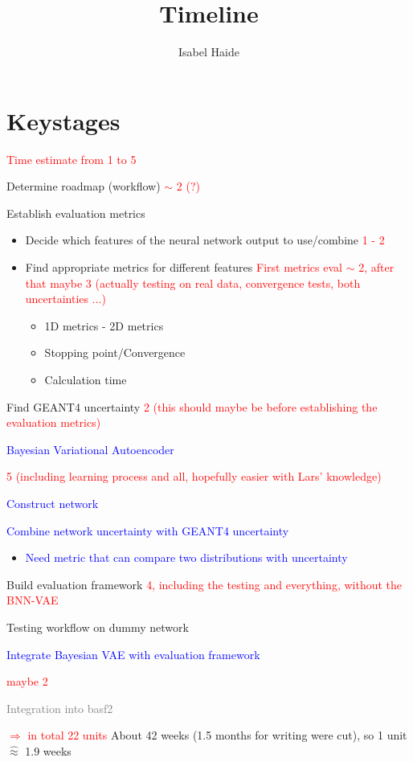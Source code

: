 \documentclass[10pt,a4paper]{article}
\author{Isabel Haide}
\title{Timeline}
\begin{document}
\section*{Keystages}
\textcolor{red}{Time estimate from 1 to 5}
\begin{itemize}
\item[(1) ] Determine roadmap (workflow) \textcolor{red}{$\sim$ 2 (?)}
\item[(2) ] Establish evaluation metrics 
\begin{itemize}
\item[(2a)] Decide which features of the neural network output to use/combine \textcolor{red}{1 - 2 }
\item[(2b)] Find appropriate metrics for different features \textcolor{red}{First metrics eval $\sim$ 2, after that maybe 3 (actually testing on real data, convergence tests, both uncertainties ...)}

\begin{itemize}
\item 1D metrics - 2D metrics
\item Stopping point/Convergence
\item Calculation time
\end{itemize}

\end{itemize}
\item[(3) ] Find GEANT4 uncertainty \textcolor{red}{2 (this should maybe be before establishing the evaluation metrics)}
\textcolor{blue}{\item[(3*)] Bayesian Variational Autoencoder} \textcolor{red}{5 (including learning process and all, hopefully easier with Lars' knowledge)}
\begin{itemize}
\item[\textcolor{blue}{(3*a)}] \textcolor{blue}{Construct network}
\textcolor{blue}{\item[(3*b)] Combine network uncertainty with GEANT4 uncertainty}
\begin{itemize}
\item[\textcolor{blue}{*}] \textcolor{blue}{Need metric that can compare two distributions with uncertainty}
\end{itemize}
\end{itemize}
\item[(4) ] Build evaluation framework \textcolor{red}{4, including the testing and everything, without the BNN-VAE}
\begin{itemize}
\item[(4a)] Testing workflow on dummy network
\textcolor{blue}{\item[(4b)] Integrate Bayesian VAE with evaluation framework} \textcolor{red}{maybe 2}
\end{itemize}
\textcolor{gray}{\item[(5) ] Integration into basf2}
\end{itemize}
\textcolor{red}{$\Rightarrow$ in total 22 units} \newline
About 42 weeks (1.5 months for writing were cut), so 1 unit $\widehat{\approx}$ 1.9 weeks \newline
\end{document}
